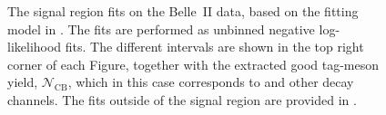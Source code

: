 \begin{figure}[htbp!]
{    }
    \caption{\label{fig:data_fits_signal}
    The \EB signal region fits on the Belle~II data, based on the fitting model in .
    The fits are performed as unbinned negative log-likelihood fits.
    The different \EB intervals are shown in the top right corner of each Figure, 
    together with the extracted good tag-\B meson yield, $\mathcal{N}_{\mathrm{CB}}$, which in this case corresponds to \BtoXsdgamma and other \BB decay channels.
    The fits outside of the signal region are provided in .
    }
\end{figure}

